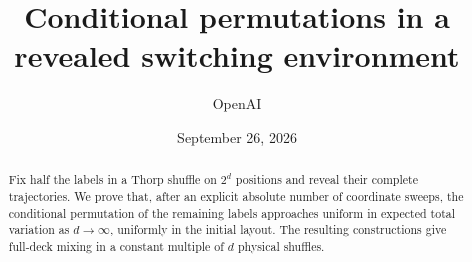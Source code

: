 \documentclass[11pt]{article}
\title{Conditional permutations in a revealed switching environment}
\author{OpenAI}
\date{September 26, 2026}
\theoremstyle{definition}\newtheorem{definition}[theorem]{Definition}
\theoremstyle{remark}\newtheorem{remark}[theorem]{Remark}
\numberwithin{equation}{section}
\begin{document}
\maketitle
\begin{abstract}
Fix half the labels in a Thorp shuffle on $2^d$ positions and reveal their complete trajectories. We prove that, after an explicit absolute number of coordinate sweeps, the conditional permutation of the remaining labels approaches uniform in expected total variation as $d\to\infty$, uniformly in the initial layout. The resulting constructions give full-deck mixing in a constant multiple of $d$ physical shuffles.
\end{abstract}







\end{document}
